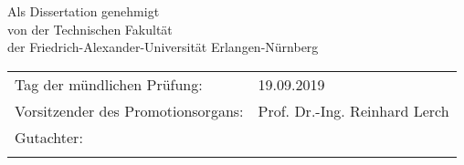 \thispagestyle{empty}


\vspace{4cm}
\begin{center}
        Als Dissertation genehmigt\\
        von der Technischen Fakultät\\
        der Friedrich-Alexander-Universität Erlangen-Nürnberg
\end{center}
    

\vspace{2cm}
\begin{tabular}{ll}
    Tag der mündlichen Prüfung:& 19.09.2019 \\

    Vorsitzender des Promotionsorgans: 	& Prof. Dr.-Ing. Reinhard Lerch  \\
    Gutachter: 		& \myProf\\
            		& \myOtherProf\\

\end{tabular}

\vfill

    
\bigskip

